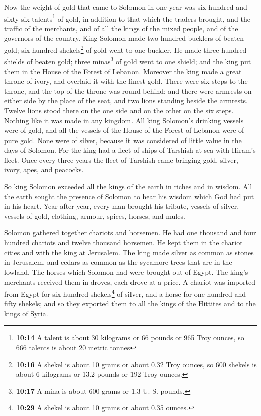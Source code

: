  Now the weight of gold that came to Solomon in one year
was six hundred and sixty-six talents\footnote{\textbf{10:14} A talent
  is about 30 kilograms or 66 pounds or 965 Troy ounces, so 666 talents
  is about 20 metric tonnes} of gold,  in addition to
that which the traders brought, and the traffic of the merchants, and of
all the kings of the mixed people, and of the governors of the country.
 King Solomon made two hundred bucklers of beaten gold;
six hundred shekels\footnote{\textbf{10:16} A shekel is about 10 grams
  or about 0.32 Troy ounces, so 600 shekels is about 6 kilograms or 13.2
  pounds or 192 Troy ounces.} of gold went to one buckler.
 He made three hundred shields of beaten gold; three
minas\footnote{\textbf{10:17} A mina is about 600 grams or 1.3 U. S.
  pounds.} of gold went to one shield; and the king put them in the
House of the Forest of Lebanon.  Moreover the king made a
great throne of ivory, and overlaid it with the finest gold.
 There were six steps to the throne, and the top of the
throne was round behind; and there were armrests on either side by the
place of the seat, and two lions standing beside the armrests.
 Twelve lions stood there on the one side and on the
other on the six steps. Nothing like it was made in any kingdom.
 All king Solomon's drinking vessels were of gold, and
all the vessels of the House of the Forest of Lebanon were of pure gold.
None were of silver, because it was considered of little value in the
days of Solomon.  For the king had a fleet of ships of
Tarshish at sea with Hiram's fleet. Once every three years the fleet of
Tarshish came bringing gold, silver, ivory, apes, and peacocks.

 So king Solomon exceeded all the kings of the earth in
riches and in wisdom.  All the earth sought the presence
of Solomon to hear his wisdom which God had put in his heart.
 Year after year, every man brought his tribute, vessels
of silver, vessels of gold, clothing, armour, spices, horses, and mules.

 Solomon gathered together chariots and horsemen. He had
one thousand and four hundred chariots and twelve thousand horsemen. He
kept them in the chariot cities and with the king at Jerusalem.
 The king made silver as common as stones in Jerusalem,
and cedars as common as the sycamore trees that are in the lowland.
 The horses which Solomon had were brought out of Egypt.
The king's merchants received them in droves, each drove at a price.
 A chariot was imported from Egypt for six hundred
shekels\footnote{\textbf{10:29} A shekel is about 10 grams or about 0.35
  ounces.} of silver, and a horse for one hundred and fifty shekels; and
so they exported them to all the kings of the Hittites and to the kings
of Syria.

